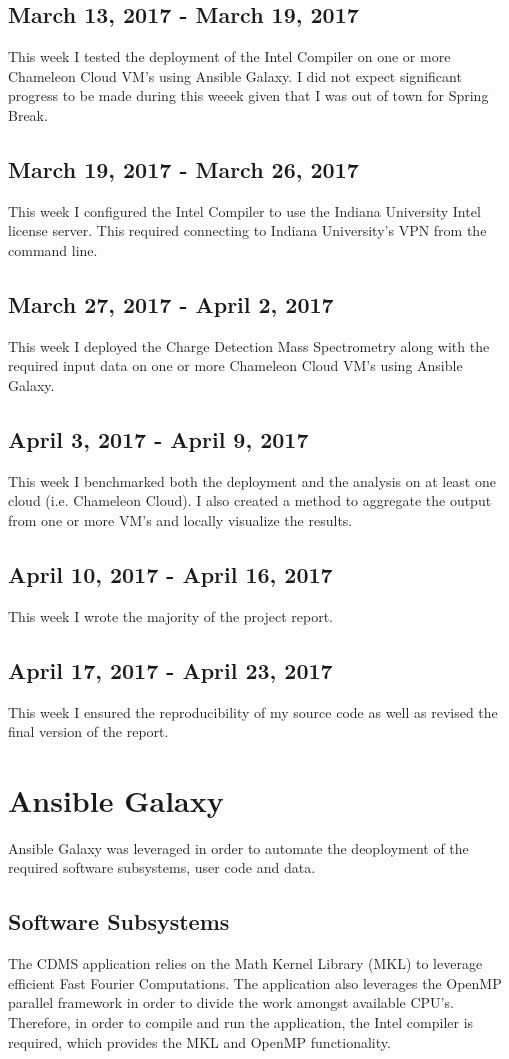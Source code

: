 \documentclass[9pt,twocolumn,twoside]{../../styles/osajnl}
\begin{document}
\subsection{March 13, 2017 - March 19, 2017}
This week I tested the deployment of the Intel Compiler on one or more
Chameleon Cloud VM's using Ansible Galaxy. I did not expect
significant progress to be made during this weeek given that I was out
of town for Spring Break.
\subsection{March 19, 2017 - March 26, 2017}
This week I configured the Intel Compiler to use the Indiana
University Intel license server. This required connecting to Indiana
University's VPN from the command line.
\subsection{March 27, 2017 - April 2, 2017}
This week I deployed the Charge Detection Mass Spectrometry along with
the required input data on one or more Chameleon Cloud VM's using
Ansible Galaxy.
\subsection{April 3, 2017 - April 9, 2017}
This week I benchmarked both the deployment and the analysis on at
least one cloud (i.e. Chameleon Cloud). I also created a method to
aggregate the output from one or more VM's and locally visualize the
results.
\subsection{April 10, 2017 - April 16, 2017}
This week I wrote the majority of the project report. 
\subsection{April 17, 2017 - April 23, 2017}
This week I ensured the reproducibility of my source code as well as
revised the final version of the report.

\section{Ansible Galaxy} \label{licensing}
Ansible Galaxy was leveraged in order to automate the deoployment of
the required software subsystems, user code and data.

\subsection{Software Subsystems} \label{software}
The CDMS application relies on the Math Kernel Library (MKL) to
leverage efficient Fast Fourier Computations. The application also
leverages the OpenMP parallel framework in order to divide the work
amongst available CPU's. Therefore, in order to compile and run the
application, the Intel compiler is required, which provides the MKL
and OpenMP functionality.
\end{document}
